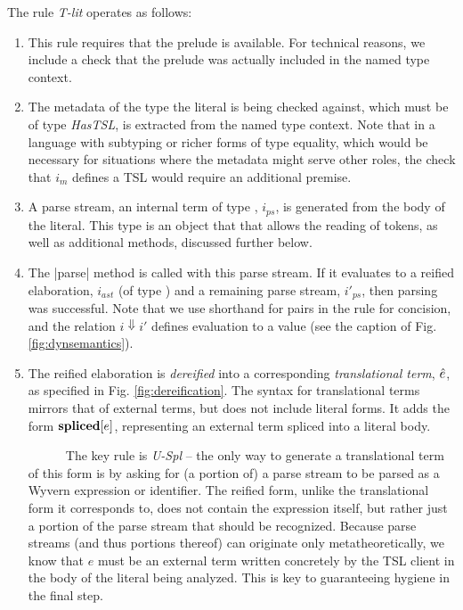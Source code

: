\noindent
The rule \textit{T-lit} operates as follows:
\begin{enumerate}
\setlength{\itemsep}{1pt}
\item This rule requires that the prelude is available. For technical reasons, we include a check that the prelude was actually included in the named type context.
\item The metadata of the type the literal is being checked against, which must be of type \textit{HasTSL}, is extracted from the named type context. Note that in a language with subtyping or richer forms of type equality, which would be necessary for situations where the metadata might serve other roles, the check that $i_m$ defines a TSL would require an additional premise. 
\item A parse stream, an internal term of type , $i_{ps}$, is generated from the body of the literal. This type is an object that that allows the reading of tokens, as well as additional methods, discussed further below.
\item The \li|parse| method is called with this parse stream. If it evaluates to a reified elaboration, $i_{ast}$ (of type ) and a remaining parse stream, $i'_{ps}$, then parsing was successful. Note that we use shorthand for pairs in the rule for concision, and the relation $i \Downarrow i'$ defines evaluation to a value (see the caption of Fig. \ref{fig:dynsemantics}).
\item The reified elaboration is \emph{dereified} into a corresponding \emph{translational term}, $\hat{e}$, as specified in Fig. \ref{fig:dereification}. The syntax for translational terms mirrors that of external terms, but does not include literal forms. It adds the form $\textbf{spliced}[e]$, representing an external term  spliced into a literal body. 

~~~~~~The key rule is \textit{U-Spl} -- the only way to generate a translational term of this form is by asking for (a portion of) a parse stream to be parsed as a Wyvern expression or identifier. The reified form, unlike the translational form it corresponds to, does not contain the expression itself, but rather just a portion of the parse stream that should be recognized. Because parse streams (and thus portions thereof) can originate only metatheoretically, we know that $e$ must be an external term written concretely by the TSL client in the body of the literal being analyzed. This is key to guaranteeing hygiene in the final step.


\end{enumerate}

